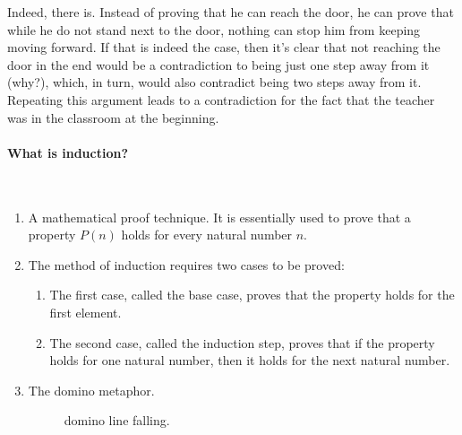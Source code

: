 Indeed, there is. Instead of proving that he can reach the door, he can prove that while he do not stand next to the door, nothing can stop him from keeping moving forward. If that is indeed the case, then it's clear that not reaching the door in the end would be a contradiction to being just one step away from it (why?), which, in turn, would also contradict being two steps away from it. Repeating this argument leads to a contradiction for the fact that the teacher was in the classroom at the beginning.

\paragraph{What is induction?}~\begin{enumerate}
    \item A mathematical proof technique. It is essentially used to prove that a property \(P(n)\) holds for every natural number \(n\).
    \item The method of induction requires two cases to be proved:
    \begin{enumerate}
        \item The first case, called the base case, proves that the property holds for the first element.
        \item The second case, called the induction step, proves that if the property holds for one natural number, then it holds for the next natural number.
    \end{enumerate}
    \item The domino metaphor. 
\begin{figure}[h]
  \centering
    \caption{ domino line falling.}
  \label{fig:domino}
\end{figure}
\end{enumerate}




